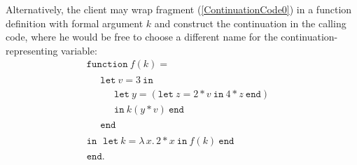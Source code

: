 Alternatively, the client may wrap fragment (\ref{ContinuationCode0})
in a function definition with formal argument $k$ and construct the
continuation in the calling code, where he would be free to choose a
different name for the continuation-representing variable:
\begin{equation}
\label{ContinuationCode1}
\begin{array}{l}
\mathtt{function}\ f (k) =\\
\quad 
\begin{array}{l}
  \mathtt{let}\ v = 3\ \mathtt{in}\\
  \quad \begin{array}{l} 
    \mathtt{let}\ y = (\mathtt{let}\ z=2*v \ \mathtt{in}\ 4*z\ \mathtt{end})\\
    \mathtt{in}\ k (y*v)\ \mathtt{end}
  \end{array}\\
  \mathtt{end}
  \end{array}\\
\mathtt{in}\
  \begin{array}{l}
  \mathtt{let}\ k = \lambda\, x .\, 2* x\ \mathtt{in}\ f(k)\ \mathtt{end}
  \end{array}\\
\mathtt{end}.
\end{array}
\end{equation}

